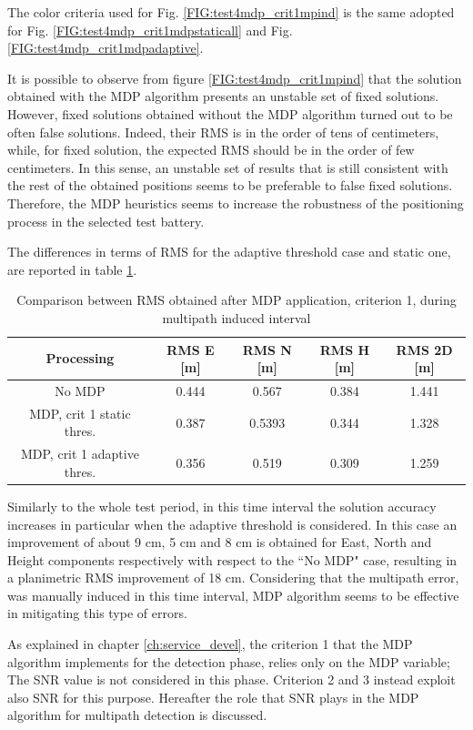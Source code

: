  The color criteria used for Fig. \ref{FIG:test4mdp_crit1mpind} is the same adopted for Fig. \ref{FIG:test4mdp_crit1mdpstaticall} and Fig. \ref{FIG:test4mdp_crit1mdpadaptive}.

It is possible to observe from figure \ref{FIG:test4mdp_crit1mpind} that  the solution obtained with the MDP algorithm presents an unstable set of fixed solutions. However, fixed solutions obtained without the MDP algorithm turned out to be  often false solutions. Indeed, their RMS is in the order of tens of centimeters, while, for fixed solution, the expected RMS should be in the order of few centimeters. In this sense, an unstable set of results  that is still consistent with the rest of the obtained positions seems to be preferable to false fixed solutions. Therefore, the MDP heuristics seems to increase the robustness of the positioning process in the selected test battery.

The differences in terms of RMS for the adaptive threshold case and static  one, are reported in table \ref{tab:mdp_crit1_mpind_table}.
\begin{table}[H]
	\centering
	\begin{tabular}{|c|c|c|c|c|}
	\hline
	\textbf{Processing} & \textbf{RMS E [m]} & \textbf{RMS N [m]} &
	\textbf{RMS H [m]}&
	\textbf{RMS 2D [m]}\\
    \hline
	No MDP & 0.444 & 0.567& 0.384&1.441\\  
    \hline
	 MDP, crit 1 static thres.& 0.387 & 0.5393& 0.344&1.328\\ \hline
	 MDP, crit 1 adaptive thres.& 0.356 & 0.519& 0.309&1.259\\ \hline
	\end{tabular} 
	\caption{Comparison between RMS obtained after MDP application, criterion 1, during multipath induced interval}
	\label{tab:mdp_crit1_mpind_table}
\end{table}

Similarly to the whole test period, in this time interval the solution accuracy increases in particular when the adaptive threshold is considered. In this case an improvement of about 9 cm, 5 cm and 8 cm is obtained for East, North and Height components respectively with respect to the ``No MDP" case, resulting in a planimetric RMS improvement of 18 cm. Considering that the multipath error, was manually induced in this time interval, MDP algorithm seems to be  effective in mitigating this type of errors.

As explained in chapter \ref{ch:service_devel}, the criterion 1 that the MDP algorithm implements for the detection phase, relies only on the MDP variable; The SNR value is not considered in this phase. Criterion 2 and 3 instead exploit also SNR for this purpose. Hereafter the role that SNR plays in the MDP algorithm for multipath detection is discussed.

